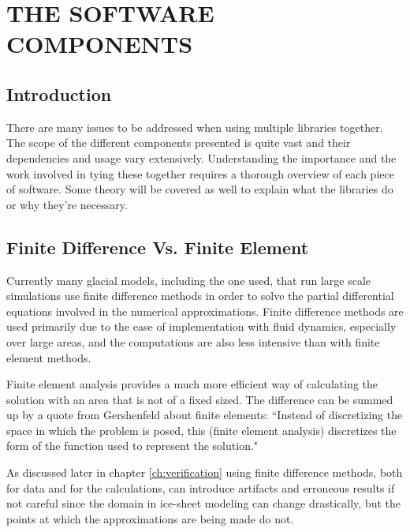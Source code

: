 
\section{THE SOFTWARE COMPONENTS}\label{ch:overview}

\subsection{Introduction}\label{sec:chp2intro}

There are many issues to be addressed when using multiple libraries together.  The scope of the different components presented is quite vast and their dependencies and usage vary extensively.  Understanding the importance and the work involved in tying these together requires a thorough overview of each piece of software.  Some theory will be covered as well to explain what the libraries do or why they're necessary.

\subsection{Finite Difference Vs. Finite Element}\label{sec:chp2grid}

Currently many glacial models, including the one used, that run large scale simulations use finite difference methods in order to solve the partial differential equations involved in the numerical approximations.  Finite difference methods are used primarily due to the ease of implementation with fluid dynamics, especially over large areas, and the computations are also less intensive than with finite element methods.

Finite element analysis provides a much more efficient way of calculating the solution with an area that is not of a fixed sized.  The difference can be summed up by a quote from Gershenfeld about finite elements: ``Instead of discretizing the space in which the problem is posed, this (finite element analysis) discretizes the form of the function used to represent the solution." \citep{Gershenfeld:1999}  

As discussed later in chapter \ref{ch:verification} using finite difference methods, both for data and for the calculations, can introduce artifacts and erroneous results if not careful since the domain in ice-sheet modeling can change drastically, but the points at which the approximations are being made do not.


